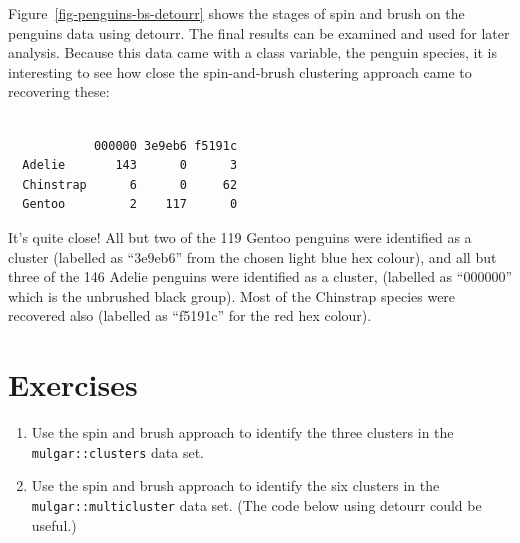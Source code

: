 \documentclass[
  letterpaper,
]{book}
\newenvironment{Shaded}{\begin{snugshade}}{\end{snugshade}}
\newcommand{\FunctionTok}[1]{\textcolor[rgb]{0.28,0.35,0.67}{#1}}
\newcommand{\NormalTok}[1]{\textcolor[rgb]{0.00,0.23,0.31}{#1}}
\newcommand{\OtherTok}[1]{\textcolor[rgb]{0.00,0.23,0.31}{#1}}
\newcommand{\SpecialCharTok}[1]{\textcolor[rgb]{0.37,0.37,0.37}{#1}}
\newcommand{\StringTok}[1]{\textcolor[rgb]{0.13,0.47,0.30}{#1}}
\providecommand{\tightlist}{%
  \setlength{\itemsep}{0pt}\setlength{\parskip}{0pt}}\usepackage{longtable,booktabs,array}
\begin{document}
Figure~\ref{fig-penguins-bs-detourr} shows the stages of spin and brush
on the penguins data using detourr. The final results can be examined
and used for later analysis. Because this data came with a class
variable, the penguin species, it is interesting to see how close the
spin-and-brush clustering approach came to recovering these:

\begin{Shaded}
\end{Shaded}

\begin{verbatim}
           
            000000 3e9eb6 f5191c
  Adelie       143      0      3
  Chinstrap      6      0     62
  Gentoo         2    117      0
\end{verbatim}

It's quite close! All but two of the 119 Gentoo penguins were identified
as a cluster (labelled as ``3e9eb6'' from the chosen light blue hex
colour), and all but three of the 146 Adelie penguins were identified as
a cluster, (labelled as ``000000'' which is the unbrushed black group).
Most of the Chinstrap species were recovered also (labelled as
``f5191c'' for the red hex colour).

\hypertarget{exercises-6}{%
\section*{Exercises}\label{exercises-6}}


\begin{enumerate}
\def\labelenumi{\arabic{enumi}.}
\tightlist
\item
  Use the spin and brush approach to identify the three clusters in the
  \texttt{mulgar::clusters} data set.
\item
  Use the spin and brush approach to identify the six clusters in the
  \texttt{mulgar::multicluster} data set. (The code below using detourr
  could be useful.)
\end{enumerate}
\end{document}
